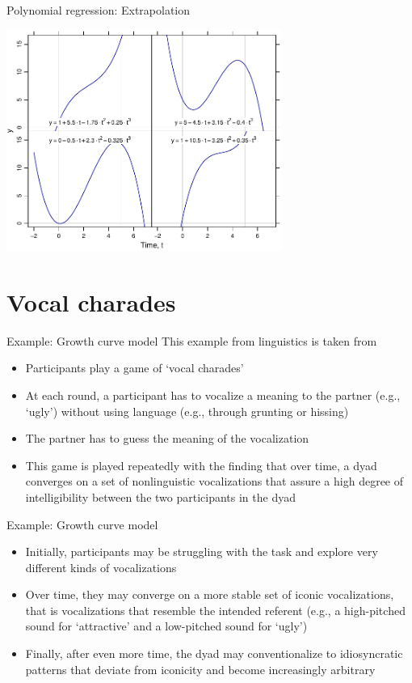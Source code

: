 \documentclass[aspectratio=169]{beamer}
\begin{document}
\begin{frame}{Polynomial regression: Extrapolation}
\begin{center}
\includegraphics[width=9cm]{../figures/cubic-gone-bad}
\end{center}
\end{frame}

\section{Vocal charades}

\begin{frame}{Example: Growth curve model}
This example from linguistics is taken from \citet{Winter2016}\\[2ex]
\begin{itemize}
  \item Participants play a game of `vocal charades'
  \item At each round, a participant has to vocalize a meaning to the
  partner (e.g., `ugly') without using language (e.g., through grunting or
  hissing)
  \item The partner has to guess the meaning of the vocalization
  \item This game is played repeatedly with the finding that over time, a
  dyad converges on a set of nonlinguistic vocalizations that assure a high
  degree of intelligibility between the two participants in the dyad
\end{itemize}
\end{frame}


\begin{frame}{Example: Growth curve model}
\begin{itemize}
  \item Initially, participants may be struggling with the task and explore
  very different kinds of vocalizations
  \item Over time, they may converge on a more stable set of iconic
  vocalizations, that is vocalizations that resemble the intended referent
  (e.g., a high-pitched sound for `attractive' and a low-pitched sound for
  `ugly')
  \item Finally, after even more time, the dyad may conventionalize to
  idiosyncratic patterns that deviate from iconicity and become
  increasingly arbitrary
\end{itemize}
\end{frame}
\end{document}
